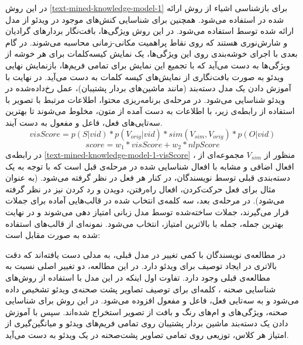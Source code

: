 در این روش
\ref{text-mined-knowledge-model-1}
 برای بازشناسی اشیاء از روش ارائه شده در 
\cite{felzenszwalb2008discriminatively}
 استفاده می‌شود. همچنین برای شناسایی کنش‌های موجود در ویدئو از مدل ارائه شده توسط 
\cite{laptev2008learning}
 استفاده می‌شود. در این روش  ویژگی‌ها، بافت‌نگار‌ بردار‌های گرادیان 
  و شارش‌نوری 
  هستند که روی نقاط پراهمیت مکانی-زمانی 
   محاسبه می‌شوند. در گام بعدی با اجرای خوشه‌بندی روی این ویژگی‌ها، یک نمایش کیسه‌کلمات 
   برای هر خوشه از ویژگی‌ها به دست می‌آید که با تجمیع این نمایش برای تمامی فریم‌ها، بازنمایش نهایی ویدئو به صورت بافت‌نگاری از نمایش‌های  کیسه کلمات به دست می‌آید. در نهایت با آموزش دادن یک مدل دسته‌بند (مانند ماشین‌های بردار پشتیبان)، عمل رخ‌داده‌شده در ویدئو شناسایی می‌شود. در مرحله‌ی برنامه‌ریزی محتوا، اطلاعات مرتبط با تصویر با استفاده از رابطه‌ی زیر، با اطلاعات به دست آمده از متون، مخلوط می‌شوند تا بهترین سه‌تایی‌های فعل، فاعل و مفعول به دست آیند.
 \begin{equation} \label{text-mined-knowledge-model-1-visScore}
visScore = p(S|vid)*p(V_{orig}|vid)*sim(V_{sim}, V_{orig})*p(O|vid)
 \end{equation} 
 \begin{equation} \label{text-mined-knowledge-model-1-score}
   score = w_1‌*‌visScore‌+ w_2 *‌nlpScore
 \end{equation} 
در رابطه‌ی
 \ref{text-mined-knowledge-model-1-visScore}
 ، منظور از 
$V_{sim}$
مجموعه‌ای از افعال اضافی و مشابه‌ با افعال شناسایی شده در مرحله‌ی قبل است که با توجه به یک دسته‌بندی قبلی توسط نویسندگان، در کنار هر فعل در نظر گرفته می‌شود. (به عنوان مثال برای فعل حرکت‌کردن، افعال راه‌رفتن، دویدن و رد کردن نیز در نظر گرفته می‌شود). در مرحله‌ی بعد، سه‌ کلمه‌ی انتخاب شده در قالب‌هایی آماده برای جملات قرار می‌گیرند، جملات ساخته‌شده توسط مدل زبانی 
\cite{pauls2011faster}
امتیاز دهی می‌شوند و در نهایت بهترین جمله، جمله‌ با بالاترین امتیاز،‌ انتخاب می‌شود. نمونه‌ای از قالب‌های استفاده شده به صورت مقابل است:

در مطالعه‌ی 
\cite{Thomason2014}
نویسندگان با کمی تغییر در مدل قبلی، به مدلی دست‌ یافته‌اند که دقت بالاتری در ایجاد توصیف برای ویدئو دارد. در این مطالعه، دو تغییر اصلی نسبت به مطالعه‌ی قبلی وجود دارد. تفاوت اول اینکه در این مدل با استفاده از روش‌های شناسایی صحنه
، کلمه‌ای برای توصیف تصاویر پشت‌ صحنه‌ی ویدئو تشخیص داده‌ می‌شود و به سه‌تایی فعل، فاعل و مفعول افزوده می‌شود. در این روش برای شناسایی صحنه، ویژگی‌های 
و ام‌های رنگ و بافت از تصویر استخراج شده‌اند. سپس با آموزش دادن یک دسته‌بند ماشین بردار پشتیبان روی تمامی فریم‌های ویدئو و میانگین‌گیری از امتیاز هر کلاس، توزیعی روی تمامی تصاویر پشت‌صحنه در یک ویدئو به دست می‌آید.

